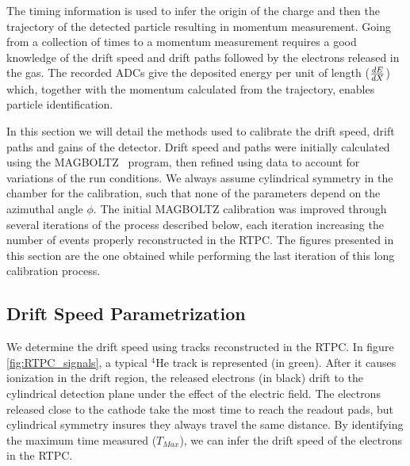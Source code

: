 \documentclass[twocolumn,showpacs,superscriptaddress,groupedaddress]{revtex4}
\begin{document}
The timing information is used to infer the origin of the charge and 
then the trajectory of the detected particle
resulting in momentum measurement. Going from a collection of 
times to a momentum measurement requires a good knowledge of the drift speed 
and drift paths followed by the electrons released in the gas. The recorded ADCs give 
the deposited energy per unit of length ($\small{\frac{dE}{dX}}$) which, 
together with the momentum calculated from the trajectory, enables particle 
identification.

In this section we will detail the methods used to calibrate the drift speed,
drift paths and gains of the detector. Drift speed and paths were initially
calculated using the MAGBOLTZ~\cite{MAGBOLTZ} program, then refined using
data to account for variations of the run conditions. We always assume 
cylindrical symmetry in the chamber for the calibration, such that none of
the parameters depend on the azimuthal angle $\phi$. The initial MAGBOLTZ
calibration was improved through several iterations of the
process described below, each iteration increasing the number of events 
properly reconstructed in the RTPC. The figures presented in this section
are the one obtained while performing the last iteration of this long 
calibration process.


\subsection{Drift Speed Parametrization}

We determine the drift speed using tracks reconstructed in the RTPC. In figure 
\ref{fig:RTPC_signals}, a typical $^{4}$He track is represented (in green). After 
it causes ionization in the drift region, the released electrons (in black) 
drift to the cylindrical detection plane under the effect of the electric field. The 
electrons released close to the cathode take the most time to reach the readout 
pads, but cylindrical symmetry insures they always travel the same 
distance. By identifying the maximum time measured ($T_{Max}$), we can infer the drift 
speed of the electrons in the RTPC.\\
\end{document}
